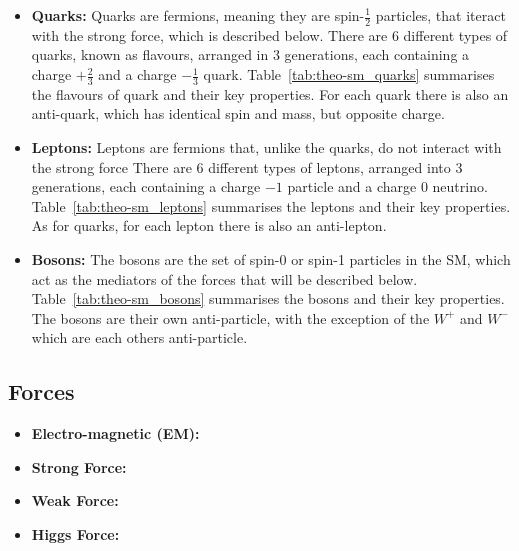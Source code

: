 \begin{itemize}[leftmargin=*]

\item\textbf{Quarks:}
  Quarks are fermions, meaning they are spin-$\frac{1}{2}$ particles,
  that iteract with the strong force, which is described below.
  There are 6 different types of quarks, known as flavours,
  arranged in 3 generations, each containing a charge $+\frac{2}{3}$ and a charge $-\frac{1}{3}$ quark.
  Table~\ref{tab:theo-sm_quarks} summarises the flavours of quark and their key properties.
  For each quark there is also an anti-quark, which has identical spin and mass, but opposite charge.\vspace{0.5em}
\item\textbf{Leptons:}
  Leptons are fermions that, unlike the quarks, do not interact with the strong force
  There are 6 different types of leptons,
  arranged into  3 generations, each containing a charge $-1$ particle and a charge 0 neutrino.
  Table~\ref{tab:theo-sm_leptons} summarises the leptons and their key properties.
  As for quarks, for each lepton there is also an anti-lepton.\vspace{0.5em}
\item\textbf{Bosons:}
  The bosons are the set of spin-0 or spin-1 particles in the SM,
  which act as the mediators of the forces that will be described below.
  Table~\ref{tab:theo-sm_bosons} summarises the bosons and their key properties.
  The bosons are their own anti-particle, with the exception of the $W^{+}$ and $W^{-}$
  which are each others anti-particle.
\end{itemize}
  
\subsection{Forces}

\begin{itemize}
\item\textbf{Electro-magnetic (EM):}
  
\item\textbf{Strong Force:}
  
\item\textbf{Weak Force:}

\item\textbf{Higgs Force:}
\end{itemize}
  

